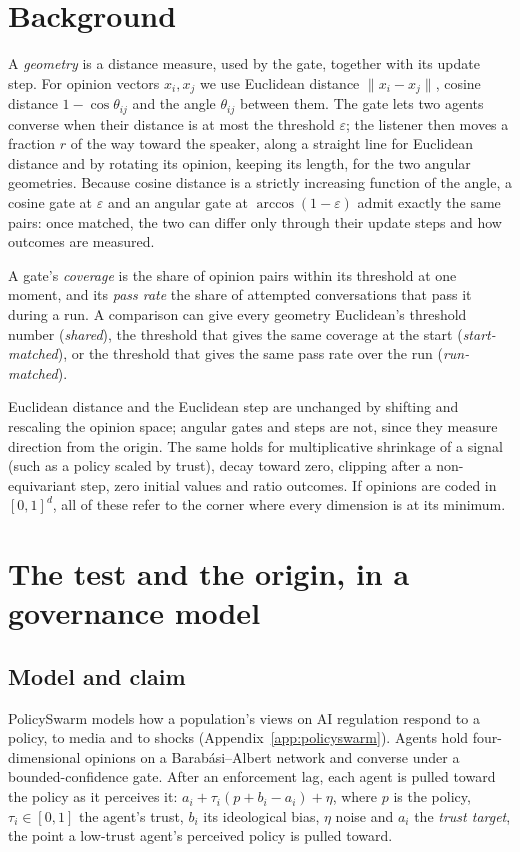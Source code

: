 \documentclass[11pt]{article}
\begin{document}
\section{Background}
\label{sec:background}

A \emph{geometry} is a distance measure, used by the gate, together with its update step.
For opinion vectors $x_i, x_j$ we use Euclidean distance $\lVert x_i - x_j\rVert$, cosine distance $1-\cos\theta_{ij}$ and the angle $\theta_{ij}$ between them.
The gate lets two agents converse when their distance is at most the threshold $\varepsilon$; the listener then moves a fraction $r$ of the way toward the speaker, along a straight line for Euclidean distance and by rotating its opinion, keeping its length, for the two angular geometries.
Because cosine distance is a strictly increasing function of the angle, a cosine gate at $\varepsilon$ and an angular gate at $\arccos(1-\varepsilon)$ admit exactly the same pairs: once matched, the two can differ only through their update steps and how outcomes are measured.

A gate's \emph{coverage} is the share of opinion pairs within its threshold at one moment, and its \emph{pass rate} the share of attempted conversations that pass it during a run.
A comparison can give every geometry Euclidean's threshold number (\emph{shared}), the threshold that gives the same coverage at the start (\emph{start-matched}), or the threshold that gives the same pass rate over the run (\emph{run-matched}).

Euclidean distance and the Euclidean step are unchanged by shifting and rescaling the opinion space; angular gates and steps are not, since they measure direction from the origin.
The same holds for multiplicative shrinkage of a signal (such as a policy scaled by trust), decay toward zero, clipping after a non-equivariant step, zero initial values and ratio outcomes.
If opinions are coded in $[0,1]^d$, all of these refer to the corner where every dimension is at its minimum.

\section{The test and the origin, in a governance model}
\label{sec:case}

\subsection{Model and claim}
PolicySwarm \citep{policyswarm} models how a population's views on AI regulation respond to a policy, to media and to shocks (Appendix~\ref{app:policyswarm}).
Agents hold four-dimensional opinions on a Barab\'asi--Albert network and converse under a bounded-confidence gate.
After an enforcement lag, each agent is pulled toward the policy as it perceives it: $a_i + \tau_i(p + b_i - a_i) + \eta$, where $p$ is the policy, $\tau_i \in [0,1]$ the agent's trust, $b_i$ its ideological bias, $\eta$ noise and $a_i$ the \emph{trust target}, the point a low-trust agent's perceived policy is pulled toward.
\end{document}
